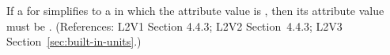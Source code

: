 If a \UnitDefinition for  simplifies to a \Unit in which the
 attribute value is , then its
 attribute value must be .  (References:
L2V1 Section 4.4.3; L2V2 Section~4.4.3; L2V3
Section~\ref{sec:built-in-units}.)
